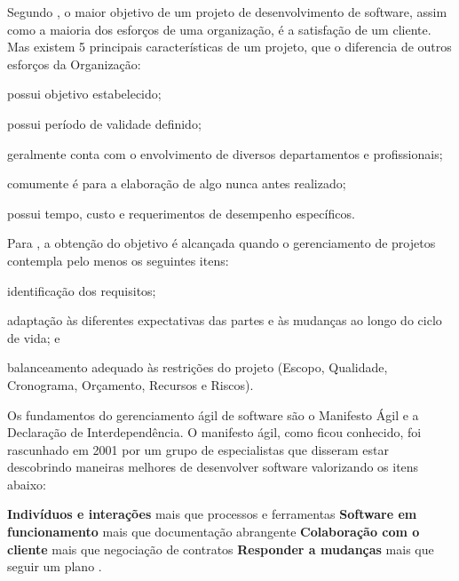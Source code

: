 \documentclass[
    12pt,               %
    openright,          %
    twoside,            %
    a4paper,            %
    chapter=TITLE,     %
    english,            %
    spanish,            %
    portuguese              %
    ]{abntex2}
\begin{document}
Segundo , o maior objetivo de um projeto de desenvolvimento de software, assim como a maioria dos esforços de uma organização, é a satisfação de um cliente. Mas existem 5 principais características de um projeto, que o diferencia de outros esforços da Organização: 

\begin{alineas}
	\item possui objetivo estabelecido;
	\item possui período de validade definido;
	\item geralmente conta com o envolvimento de diversos departamentos e profissionais;
	\item comumente é para a elaboração de algo nunca antes realizado;
	\item possui tempo, custo e requerimentos de desempenho específicos.
\end{alineas}

Para , a obtenção do objetivo é alcançada quando o gerenciamento de projetos contempla pelo menos os seguintes itens:

\begin{alineas}
	\item identificação dos requisitos;
	\item adaptação às diferentes expectativas das partes e às mudanças ao longo do ciclo de vida; e
	\item balanceamento adequado às restrições do projeto (Escopo, Qualidade, Cronograma, Orçamento, Recursos e Riscos).
\end{alineas}

Os fundamentos do gerenciamento ágil de software são o Manifesto Ágil e a Declaração de Interdependência.
O manifesto ágil, como ficou conhecido, foi rascunhado em 2001 por um grupo de especialistas que disseram estar descobrindo maneiras melhores de desenvolver software valorizando os itens abaixo:

\begin{citacao}
\textbf{Indivíduos e interações} mais que processos e ferramentas \newline
\textbf{Software em funcionamento} mais que documentação abrangente \newline
\textbf{Colaboração com o cliente} mais que negociação de contratos \newline
\textbf{Responder a mudanças} mais que seguir um plano \cite{manifesto2001}.
\end{citacao}
\end{document}
